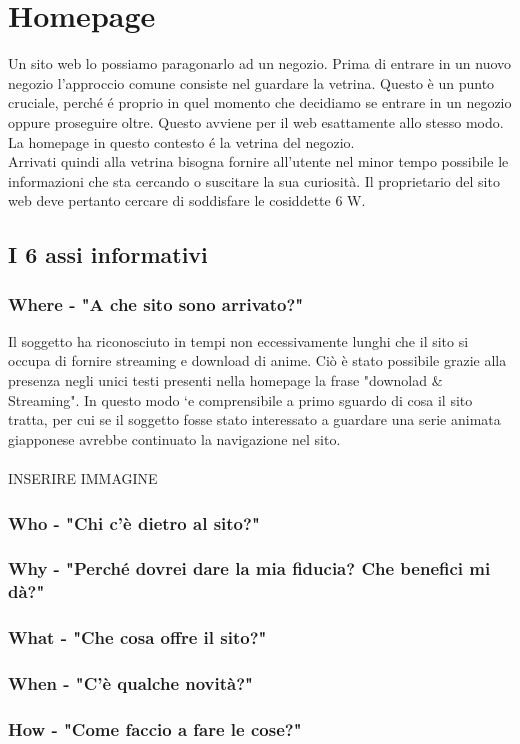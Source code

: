 \section{Homepage}
Un sito web lo possiamo paragonarlo ad un negozio. Prima di entrare in un nuovo negozio l’approccio comune consiste nel guardare la vetrina. Questo è un punto cruciale, perché é proprio in quel momento che decidiamo se entrare in un negozio oppure proseguire oltre. Questo avviene per il web esattamente allo stesso modo. La homepage in questo contesto é la vetrina del negozio. \\
Arrivati quindi alla vetrina bisogna fornire all'utente nel minor tempo possibile le informazioni che sta cercando o  suscitare la sua curiosità. Il proprietario del sito web deve pertanto cercare di soddisfare le cosiddette 6 W. 


\subsection{I 6 assi informativi}

\subsubsection{Where - "A che sito sono arrivato?"}
Il soggetto ha riconosciuto in tempi non eccessivamente lunghi che il sito si occupa di fornire streaming e download di anime. Ciò è stato possibile grazie alla presenza negli unici testi presenti nella homepage la frase "downolad \& Streaming". In questo modo `e comprensibile a primo sguardo di cosa il sito tratta, per cui se il soggetto fosse stato interessato a guardare una serie animata giapponese avrebbe continuato la navigazione nel sito.
\\
\\
INSERIRE IMMAGINE

\subsubsection{Who - "Chi c'è dietro al sito?"}

\subsubsection{Why - "Perché dovrei dare la mia fiducia? Che benefici mi dà?"}

\subsubsection{What - "Che cosa offre il sito?"}

\subsubsection{When - "C'è qualche novità?"}

\subsubsection{How - "Come faccio a fare le cose?"}

